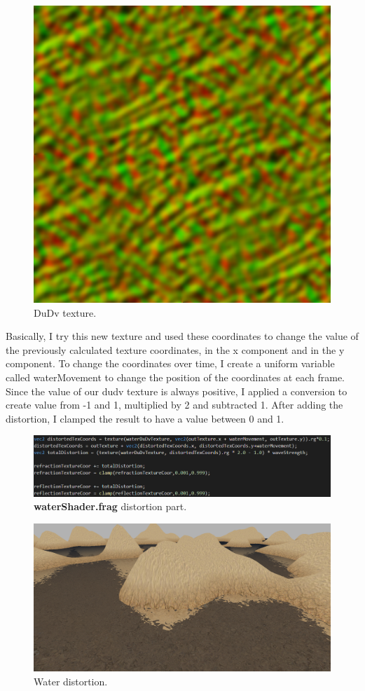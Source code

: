 \begin{figure}[hbt!]
	\centering
	\includegraphics[width= 0.5
	\textwidth]{../textures/plane/waterDUDV.png}
	\caption{DuDv texture.}
\end{figure} 

\noindent
Basically, I try this new texture and used these coordinates to change the value of the previously calculated texture coordinates, in the x component and in the y component. To change the coordinates over time, I create a uniform variable called waterMovement to change the position of the coordinates at each frame. Since the value of our dudv texture is always positive, I applied a conversion to create value from -1 and 1, multiplied by 2 and subtracted 1. After adding the distortion, I clamped the result to have a value between 0 and 1.

\begin{figure}[hbt!]
	\centering
	\includegraphics[width= 1
	\textwidth]{images/TextDist.png}
	\caption{\textbf{waterShader.frag} distortion part.}
\end{figure}

\begin{figure}[hbt!]
	\centering
	\includegraphics[width= 1
	\textwidth]{images/Water4.png}
	\caption{Water distortion.}
	\label{fig::distortion}
\end{figure}

